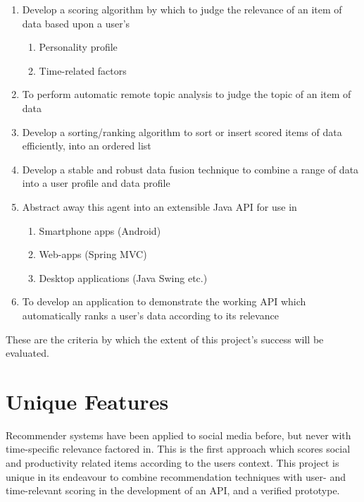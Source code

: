 \begin{enumerate}
	\item Develop a scoring algorithm by which to judge the relevance of an item of data based upon a user's
	\begin{enumerate}
		\item Personality profile
		\item Time-related factors
	\end{enumerate}
	\item To perform automatic remote topic analysis to judge the topic of an item of data
	\item Develop a sorting/ranking algorithm to sort or insert scored items of data efficiently, into an ordered list
	\item Develop a stable and robust data fusion technique to combine a range of data into a user profile and data profile
	\item Abstract away this agent into an extensible Java API for use in
	\begin{enumerate}
		\item Smartphone apps (Android)
		\item Web-apps (Spring MVC)
		\item Desktop applications (Java Swing etc.)
	\end{enumerate}
	\item To develop an application to demonstrate the working API which automatically ranks a user's data according to its relevance
\end{enumerate}

These are the criteria by which the extent of this project's success will be evaluated.

\section{Unique Features}

Recommender systems have been applied to social media before, but never with time-specific relevance factored in. This is the first approach which scores social and productivity related items according to the users context. This project is unique in its endeavour to combine recommendation techniques with user- and time-relevant scoring in the development of an API, and a verified prototype.